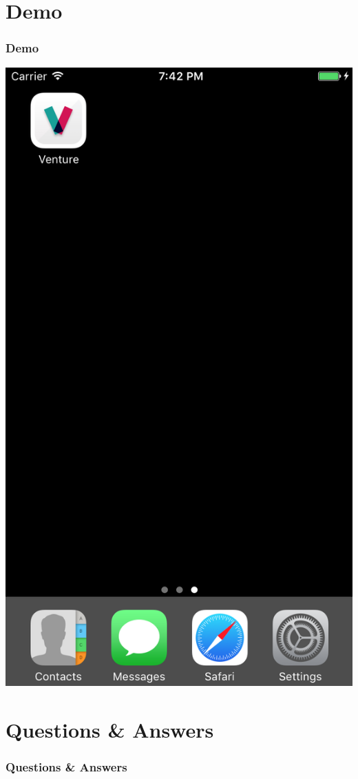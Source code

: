 \documentclass{beamer}
\begin{document}
\section{Demo}
\begin{frame}
\frametitle{Demo}
    \begin{center}
        \includegraphics[scale=0.3]{home}
    \end{center}
\end{frame}

\section{Questions \& Answers}
\begin{frame}
\frametitle{Questions \& Answers}
\end{frame}
\end{document}
